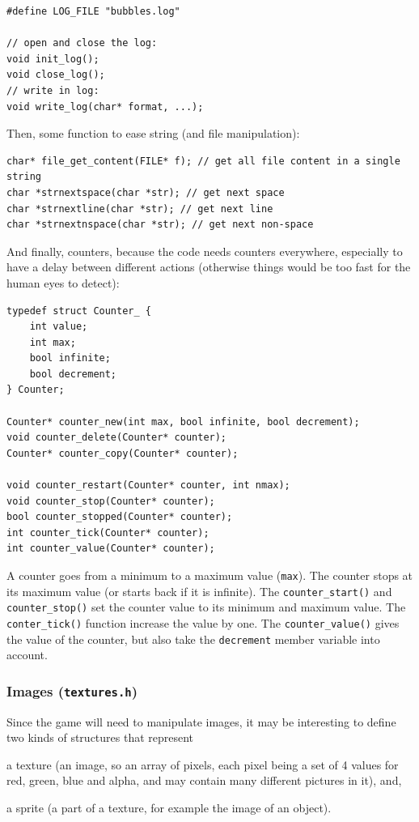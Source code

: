 \documentclass[12pt,a4paper]{article}
\newcommand{\cc}[1]{\texttt{#1}}
\begin{document}
\begin{verbatim}
#define LOG_FILE "bubbles.log"

// open and close the log:
void init_log();
void close_log();
// write in log:
void write_log(char* format, ...);
\end{verbatim}

Then, some function to ease string (and file manipulation):

\begin{verbatim}
char* file_get_content(FILE* f); // get all file content in a single string
char *strnextspace(char *str); // get next space
char *strnextline(char *str); // get next line
char *strnextnspace(char *str); // get next non-space
\end{verbatim}

And finally, counters, because the code needs counters everywhere, especially to have a delay between different actions (otherwise things would be too fast for the human eyes to detect): 

\begin{verbatim}
typedef struct Counter_ {
    int value;
    int max;
    bool infinite;
    bool decrement;
} Counter;

Counter* counter_new(int max, bool infinite, bool decrement);
void counter_delete(Counter* counter);
Counter* counter_copy(Counter* counter);

void counter_restart(Counter* counter, int nmax);
void counter_stop(Counter* counter);
bool counter_stopped(Counter* counter);
int counter_tick(Counter* counter);
int counter_value(Counter* counter);
\end{verbatim}

A counter goes from a minimum to a maximum value (\cc{max}). The counter stops at its maximum value (or starts back if it is infinite). The \cc{counter_start()} and \cc{counter_stop()} set the counter value to its minimum and maximum value. The \cc{conter_tick()} function increase the value by one. The \cc{counter_value()} gives the value of the counter, but also take the \cc{decrement} member variable into account.

\subsubsection{Images (\texttt{textures.h})}

Since the game will need to manipulate images, it may be interesting to define two kinds of structures that represent \begin{inparaenum}[i)]
\item a texture (an image, so an array of pixels, each pixel being a set of 4 values for red, green, blue and alpha, and may contain many different pictures in it), and,
\item a sprite (a part of a texture, for example the image of an object).
\end{inparaenum}
\end{document}
